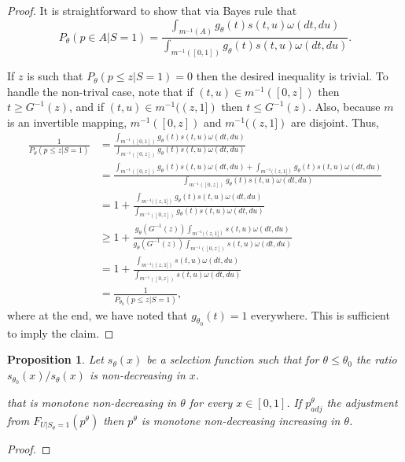 \documentclass{article}
\newtheorem{proposition}{Proposition}
\begin{document}
\begin{appendix}
\begin{proof}
It is straightforward to show that via Bayes rule that 
\begin{equation*}
    P_{\theta}(p \in A| S = 1) = \frac{\int_{m^{-1}(A)} g_{\theta}(t) s(t, u) \omega(dt, du) }{\int_{m^{-1}([0, 1])} g_{\theta}(t) s(t, u) \omega(dt, du)}. 
\end{equation*}

If $z$ is such that $P_{\theta}(p \leq z | S = 1)  = 0$ then the desired inequality is trivial. To handle the non-trival case, note that if $(t, u) \in m^{-1}([0, z])$ then $t \geq G^{-1}(z)$, and if $(t, u) \in m^{-1}((z, 1])$ then $t \leq G^{-1}(z)$. Also, because $m$ is an invertible mapping, $m^{-1}([0, z])$ and $m^{-1}((z, 1])$ are disjoint. Thus, 
\begin{align*}
     \frac{1}{P_{\theta}(p \leq z | S = 1)} &= \frac{\int_{m^{-1}([0, 1])} g_{\theta}(t) s(t, u) \omega(dt, du) }{\int_{m^{-1}([0, z])} g_{\theta}(t) s(t, u) \omega(dt, du) }\\
                                            &= \frac{\int_{m^{-1}([0, z])} g_{\theta}(t) s(t, u) \omega(dt, du) + \int_{m^{-1}((z, 1])} g_{\theta}(t)  s(t, u)\omega(dt, du) }{\int_{m^{-1}([0, z])} g_{\theta}(t) s(t, u) \omega(dt, du) }\\
                                            &= 1 + \frac{\int_{m^{-1}((z, 1])} g_{\theta}(t) s(t, u) \omega(dt, du)}{\int_{m^{-1}([0, z])} g_{\theta}(t) s(t, u) \omega(dt, du)}\\
                                            &\geq 1 + \frac{g_{\theta}(G^{-1}(z))  \int_{m^{-1}((z, 1])}  s(t, u) \omega(dt, du)}{g_{\theta}(G^{-1}(z)) \int_{m^{-1}([0, z])} s(t, u) \omega(dt, du)} \\
                                            &= 1 + \frac{\int_{m^{-1}((z, 1])} s(t, u) \omega(dt, du)}{ \int_{m^{-1}([0, z])} s(t, u) \omega(dt, du)} \\
                                            &= \frac{1}{P_{\theta_0}(p \leq z | S = 1)}, 
\end{align*}
where at the end, we have noted that $g_{\theta_0}(t) = 1$ everywhere. This is sufficient to imply the claim. 
\end{proof}

\begin{proposition}
    \label{prop:monotone_adjustment}
    Let $s_{\theta}(x)$ be a selection function such that for $\theta \leq \theta_0$ the ratio $s_{\theta_0}(x)/s_{\theta}(x)$ is non-decreasing in $x$. 
    
    
    that is monotone non-decreasing in $\theta$ for every $x \in [0, 1]$. If $p^{\theta}_{adj}$ the adjustment from $F_{U | S_{\theta} = 1}(p^{\theta})$ then $p^{\theta}$ is monotone non-decreasing increasing in $\theta$.  
\end{proposition}
\begin{proof}


\end{proof}
\end{appendix}
\end{document}
